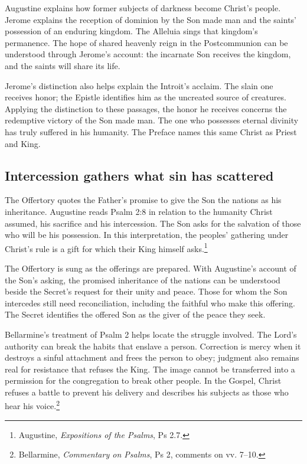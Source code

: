 Augustine explains how former subjects of darkness become Christ's people. Jerome explains the reception of dominion by the Son made man and the saints' possession of an enduring kingdom. The Alleluia sings that kingdom's permanence. The hope of shared heavenly reign in the Postcommunion can be understood through Jerome's account: the incarnate Son receives the kingdom, and the saints will share its life.

Jerome's distinction also helps explain the Introit's acclaim. The slain one receives honor; the Epistle identifies him as the uncreated source of creatures. Applying the distinction to these passages, the honor he receives concerns the redemptive victory of the Son made man. The one who possesses eternal divinity has truly suffered in his humanity. The Preface names this same Christ as Priest and King.

\subsection{Intercession gathers what sin has scattered}
The Offertory quotes the Father's promise to give the Son the nations as his inheritance. Augustine reads Psalm 2:8 in relation to the humanity Christ assumed, his sacrifice and his intercession. The Son asks for the salvation of those who will be his possession. In this interpretation, the peoples' gathering under Christ's rule is a gift for which their King himself asks.\footnote{Augustine, \emph{Expositions of the Psalms}, Ps 2.7.}

The Offertory is sung as the offerings are prepared. With Augustine's account of the Son's asking, the promised inheritance of the nations can be understood beside the Secret's request for their unity and peace. Those for whom the Son intercedes still need reconciliation, including the faithful who make this offering. The Secret identifies the offered Son as the giver of the peace they seek.

Bellarmine's treatment of Psalm 2 helps locate the struggle involved. The Lord's authority can break the habits that enslave a person. Correction is mercy when it destroys a sinful attachment and frees the person to obey; judgment also remains real for resistance that refuses the King. The image cannot be transferred into a permission for the congregation to break other people. In the Gospel, Christ refuses a battle to prevent his delivery and describes his subjects as those who hear his voice.\footnote{Bellarmine, \emph{Commentary on Psalms}, Ps 2, comments on vv. 7--10.}

